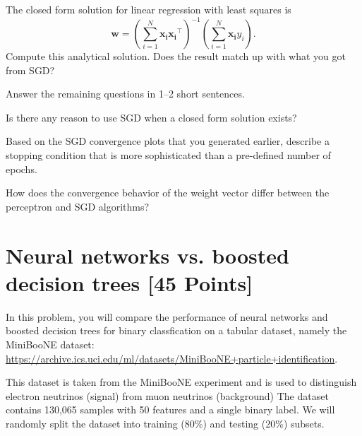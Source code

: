 \begin{problem}[2]
The closed form solution for linear regression with least squares is \[\mathbf{w} = \left(\sum_{i=1}^N \mathbf{x_i}\mathbf{x_i}^\intercal\right)^{-1}\left(\sum_{i=1}^N \mathbf{x_i}y_i\right).\]
Compute this analytical solution.
Does the result match up with what you got from SGD?
\end{problem}
\begin{solution}

\end{solution}

Answer the remaining questions in 1--2 short sentences.

\begin{problem}[2]
Is there any reason to use SGD when a closed form solution exists?
\end{problem}
\begin{solution}

\end{solution}

\begin{problem}[2]
Based on the SGD convergence plots that you generated earlier, describe a stopping condition that is more sophisticated than a pre-defined number of epochs.
\end{problem}
\begin{solution}

\end{solution}

\begin{problem}[2]
How does the convergence behavior of the weight vector differ between the perceptron and SGD algorithms?
\end{problem}
\begin{solution}
\end{solution}


\section{Neural networks vs. boosted decision trees [45 Points]}

In this problem, you will compare the performance of neural networks and boosted decision trees for binary classfication on a tabular dataset, namely the MiniBooNE dataset: \url{https://archive.ics.uci.edu/ml/datasets/MiniBooNE+particle+identification}.

This dataset is taken from the MiniBooNE experiment and is used to distinguish electron neutrinos (signal) from muon neutrinos (background)
The dataset contains 130,065 samples with 50 features and a single binary label.
We will randomly split the dataset into training (80\%) and testing (20\%) subsets.

